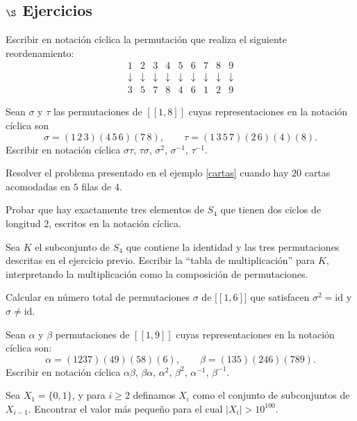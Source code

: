 \subsection*{$\S$ Ejercicios}
\begin{enumex}
\item Escribir en notación cíclica la permutación que realiza el siguiente reordenamiento:
$$
\begin{matrix} 1&2&3&4&5&6&7&8&9 \\
\downarrow&\downarrow&\downarrow&\downarrow&
\downarrow&\downarrow&\downarrow&\downarrow&\downarrow
\\ 3&5 &7 &8 &4 &6 &1 &2 &9
\end{matrix}
$$

\item Sean $\sigma$ y $\tau$ las permutaciones de $[[1,8]]$ cuyas representaciones en la notación cíclica son
$$
\sigma= (1\,2\,3)(4\,5\,6)(7\,8),\qquad
\tau=(1\,3\,5\,7)(2\,6)(4)(8).
$$
Escribir en notación cíclica $\sigma\tau$, $\tau\sigma$, $\sigma^2$, $\sigma^{-1}$, $\tau^{-1}$. 

\item Resolver el problema presentado en el ejemplo \ref{cartas} cuando hay $20$ cartas acomodadas en $5$ filas de $4$.

\item Probar que hay exactamente tres elementos de $S_4$ que tienen dos ciclos de longitud $2$, escritos en la notación cíclica. 

\item Sea $K$ el subconjunto de $S_4$ que contiene la identidad y las tres permutaciones descritas en el ejercicio previo. Escribir la ``tabla de multiplicación'' para $K$, interpretando la multiplicación como la composición de permutaciones.

\item Calcular en número total de permutaciones $\sigma$ de $\mathbb [[1,6]]$ que satisfacen $\sigma^2=\text{id}$ y $\sigma\not=\text{id}$.
\item Sean $\alpha$ y $\beta$ permutaciones de $[[1,9]]$ cuyas representaciones en la notación cíclica son:
$$
\alpha= (1237)(49)(58)(6),\qquad \beta=(135)(246)(789).
$$
Escribir en notación cíclica $\alpha\beta$, $\beta\alpha$, $\alpha^2$, $\beta^2$, $\alpha^{-1}$, $\beta^{-1}$.

\item Sea $X_1=\{0,1\}$, y para $i\ge 2$ definamos $X_i$ como el conjunto de subconjuntos de $X_{i-1}$. Encontrar el valor más pequeño para el cual $|X_i|>10^{100}$.


\end{enumex}
